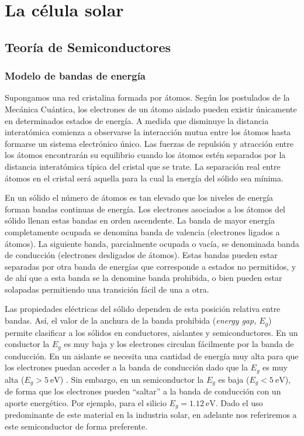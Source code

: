
\chapter{La célula solar\label{cha:Celula}}

\nocite{LopezAraujo1986}


\section{Teoría de Semiconductores}


\subsection{Modelo de bandas de energía}

Supongamos una red cristalina formada por átomos. Según los postulados
de la Mecánica Cuántica, los electrones de un átomo aislado pueden
existir únicamente en determinados estados de energía. A medida que
disminuye la distancia interatómica comienza a observarse la interacción
mutua entre los átomos hasta formarse un sistema electrónico único.
Las fuerzas de repulsión y atracción entre los átomos encontrarán
su equilibrio cuando los átomos estén separados por la distancia interatómica
típica del cristal que se trate. La separación real entre átomos en
el cristal será aquella para la cual la energía del sólido sea mínima.

En un sólido el número de átomos es tan elevado que los niveles de
energía forman bandas continuas de energía. Los electrones asociados
a los átomos del sólido llenan estas bandas en orden ascendente. La
banda de mayor energía completamente ocupada se denomina banda de
valencia (electrones ligados a átomos). La siguiente banda, parcialmente
ocupada o vacía, se denominada banda de conducción (electrones desligados
de átomos). Estas bandas pueden estar separadas por otra banda de
energías que corresponde a estados no permitidos, y de ahí que a esta
banda se la denomine banda prohibida, o bien pueden estar solapadas
permitiendo una transición fácil de una a otra. 

Las propiedades eléctricas del sólido dependen de esta posición relativa
entre bandas. Así, el valor de la anchura de la banda prohibida (\emph{energy
gap, }$E_{g}$) permite clasificar a los sólidos en conductores, aislantes
y semiconductores. En un conductor la $E_{g}$
es muy baja y los electrones circulan fácilmente por la banda de conducción.
En un aislante se necesita una cantidad de energía muy alta para que
los electrones puedan acceder a la banda de conducción dado que la
$E_{g}$ es muy alta ($E_{g}>\SI{5}{\electronvolt}$) . Sin embargo,
en un semiconductor la $E_{g}$ es baja ($E_{g}<\SI{5}{\electronvolt}$),
de forma que los electrones pueden {}``saltar'' a la banda de conducción
con un aporte energético. Por ejemplo, para el silicio $E_{g}=\SI{1.12}{\electronvolt}$.
Dado el uso predominante de este material en la industria solar, en
adelante nos referiremos a este semiconductor de forma preferente.


